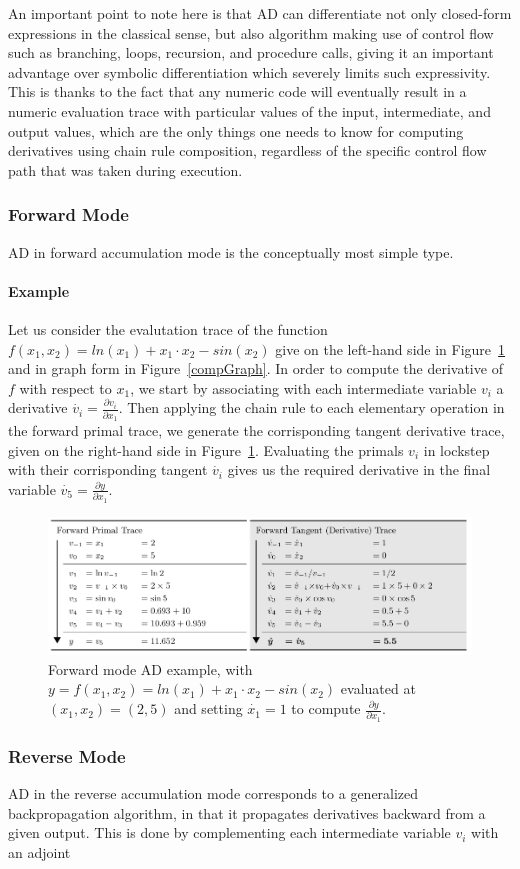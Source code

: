 \vspace*{4mm}
An important point to note here is that AD can differentiate not only closed-form expressions in the classical sense, but also algorithm making use of control flow such as branching, loops, recursion, and procedure calls, giving it an important advantage over symbolic differentiation which severely limits such expressivity. This is thanks to the fact that any numeric code will eventually result in a numeric evaluation trace with particular values of the input, intermediate, and output values, which are the only things one needs to know for computing derivatives using chain rule composition, regardless of the specific control flow path that was taken during execution.

\subsubsection{Forward Mode}
AD in forward accumulation mode is the conceptually most simple type.

\paragraph{Example}
Let us consider the evalutation trace of the function $f(x_1,x_2)= ln(x_1)+ x_1 \cdot x_2 -sin(x_2)$ give on the left-hand side in Figure~\ref{evalTrace} and in graph form in Figure~\ref{compGraph}. In order to compute the derivative of $f$ with respect to $x_1$, we start by associating with each intermediate variable $v_i$ a derivative $\dot{v_i}=\frac{\partial v_i}{\partial x_1}$. Then applying the chain rule to each elementary operation in the forward primal trace, we generate the corrisponding tangent derivative trace, given on the right-hand side in Figure~\ref{evalTrace}. Evaluating the primals $v_i$ in lockstep with their corrisponding tangent $\dot{v_i}$ gives us the required derivative in the final variable $\dot{v_5}=\frac{\partial y}{\partial x_1}$.

\begin{figure}[h!]
	\centering \includegraphics[scale=0.47]{img/evalTrace}
	\caption{Forward mode AD example, with $y=f(x_1,x_2)= ln(x_1)+ x_1 \cdot x_2 -sin(x_2)$ evaluated at $(x_1, x_2)=(2,5)$ and setting $\dot{x_1}=1$ to compute $\frac{\partial y}{\partial x_1}$.}
	\label{evalTrace}
\end{figure}

\subsubsection{Reverse Mode}
AD in the reverse accumulation mode corresponds to a generalized backpropagation algorithm, in that it propagates derivatives backward from a given output. This is done by complementing each intermediate variable $v_i$ with an adjoint 